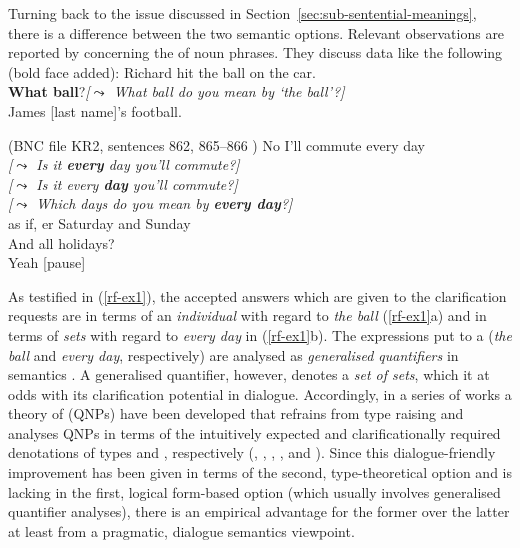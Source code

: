 \documentclass[output=paper]{langsci/langscibook}
\begin{document}
{Turning back to the issue discussed in Section~\ref{sec:sub-sentential-meanings}, there is a difference between the two semantic options.
%
Relevant observations are reported by \citet{Purver:Ginzburg:2004} concerning the  of noun phrases.
%
They discuss data like the following (bold face added):
%
\ea \label{rf-ex1}
  \ea  {} Richard hit the ball on the car. \\
 \textbf{What ball}?\hspace*{0.25cm}\emph{[$\leadsto$ What ball do you mean by  `the ball'?]} \\
 James [last name]'s football. \par\smallskip
\hfill (BNC file KR2, sentences 862, 865--866 )
  \ex {} No I'll commute every day \\
 \emph{[$\leadsto$ Is it \textbf{every} day you'll commute?]}\\
 \emph{[$\leadsto$ Is it every \textbf{day} you'll commute?]}\\
 \emph{[$\leadsto$ Which days do you mean by \textbf{every day}?]}\\
 as if, er Saturday and Sunday \\
 And all holidays? \\
 Yeah [pause]
  \z
\z

As testified in (\ref{rf-ex1}), the accepted answers which are given to the clarification requests are in terms of an \emph{individual} with regard to \textit{the ball} (\ref{rf-ex1}a) and in terms of \emph{sets} with regard to \textit{every day} in (\ref{rf-ex1}b).
%
The expressions put to a  (\textit{the ball} and \textit{every day}, respectively) are analysed as \emph{generalised quantifiers}  in semantics \citep{montague73}.
%
A generalised quantifier, however, denotes a \emph{set of sets}, which it at odds with its clarification potential in dialogue. 
%
Accordingly, in a series of works a theory of  (QNPs) have been developed that refrains from type raising and analyses QNPs in terms of the intuitively expected and clarificationally required denotations of types  and , respectively  (\citet{Purver:Ginzburg:2004},  \citet{Ginzburg:Purver:2012}, \citet{Ginzburg:2012}, \citet{Cooper:2013}, \citet{Luecking:Ginzburg:2018} and \citet{Cooper:ms}). 
%
Since this dialogue-friendly improvement has been given in terms of the second, type-theoretical option and is lacking in the first, logical form-based option (which usually involves generalised quantifier analyses), there is an empirical advantage for the former over the latter at least from a pragmatic, dialogue semantics viewpoint.


}
\end{document}
